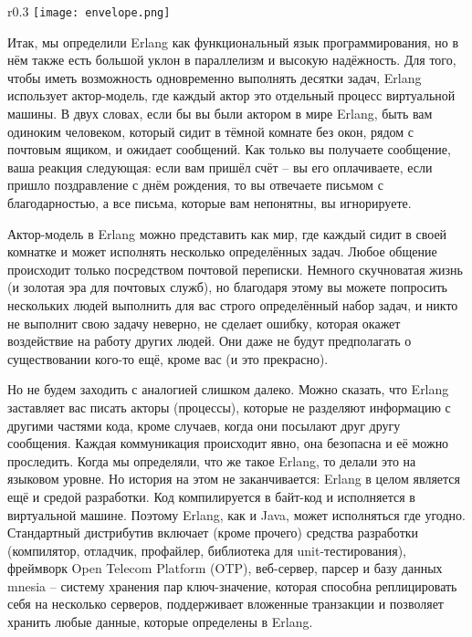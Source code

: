 \begin{wrapfigure}{r}{0.3\linewidth}
    \texttt{[image: envelope.png]}
\end{wrapfigure}
Итак, мы определили Erlang как функциональный язык программирования, но в нём также есть большой уклон в параллелизм и высокую надёжность. Для того, чтобы иметь возможность одновременно выполнять десятки задач, Erlang использует актор\--модель, где каждый актор это отдельный процесс виртуальной машины. В двух словах, если бы вы были актором в мире Erlang, быть вам одиноким человеком, который сидит в тёмной комнате без окон, рядом с почтовым ящиком, и ожидает сообщений. Как только вы получаете сообщение, ваша реакция следующая: если вам пришёл счёт \--- вы его оплачиваете, если пришло поздравление с днём рождения, то вы отвечаете письмом с благодарностью, а все письма, которые вам непонятны, вы игнорируете.

Актор\--модель в Erlang можно представить как мир, где каждый сидит в своей комнатке и может исполнять несколько определённых задач. Любое общение происходит только посредством почтовой переписки. Немного скучноватая жизнь (и золотая эра для почтовых служб), но благодаря этому вы можете попросить нескольких людей выполнить для вас строго определённый набор задач, и никто не выполнит свою задачу неверно, не сделает ошибку, которая окажет воздействие на работу других людей. Они даже не будут предполагать о существовании кого\--то ещё, кроме вас (и это прекрасно).

Но не будем заходить с аналогией слишком далеко. Можно сказать, что Erlang заставляет вас писать акторы (процессы), которые не разделяют информацию с другими частями кода, кроме случаев, когда они посылают друг другу сообщения. Каждая коммуникация происходит явно, она безопасна и её можно проследить.
Когда мы определяли, что же такое Erlang, то делали это на языковом уровне. Но история на этом не заканчивается: Erlang в целом является ещё и средой разработки. Код компилируется в байт\--код и исполняется в виртуальной машине. Поэтому Erlang, как и Java, может исполняться где угодно. Стандартный дистрибутив включает (кроме прочего) средства разработки (компилятор, отладчик, профайлер, библиотека для unit\--тестирования), фреймворк Open Telecom Platform (OTP), веб\--сервер, парсер и базу данных mnesia \--- систему хранения пар ключ\--значение, которая способна реплицировать себя на несколько серверов, поддерживает вложенные транзакции и позволяет хранить любые данные, которые определены в Erlang.


